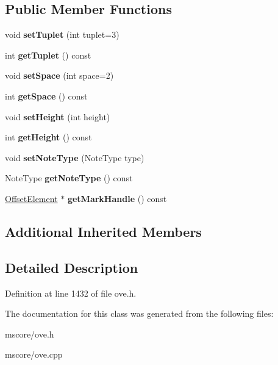 \subsection*{Public Member Functions}
\begin{DoxyCompactItemize}
\item 
\mbox{\label{class_o_v_e_1_1_tuplet_a0a871e9d3666c80bb87b34a4bd3e5e19}} 
void {\bfseries set\+Tuplet} (int tuplet=3)
\item 
\mbox{\label{class_o_v_e_1_1_tuplet_a838cfee16da0363566c0bbf0e7708576}} 
int {\bfseries get\+Tuplet} () const
\item 
\mbox{\label{class_o_v_e_1_1_tuplet_a61881d9943de95645859165c1b688b90}} 
void {\bfseries set\+Space} (int space=2)
\item 
\mbox{\label{class_o_v_e_1_1_tuplet_a9fd7ed16acbab11a164ba84dbc19b92f}} 
int {\bfseries get\+Space} () const
\item 
\mbox{\label{class_o_v_e_1_1_tuplet_a603f43330c648c3e2f2c045fbc0326b7}} 
void {\bfseries set\+Height} (int height)
\item 
\mbox{\label{class_o_v_e_1_1_tuplet_a4018f1a7977c174208a445ae7016134d}} 
int {\bfseries get\+Height} () const
\item 
\mbox{\label{class_o_v_e_1_1_tuplet_a3742508b5cff3284aa8d232e3b121126}} 
void {\bfseries set\+Note\+Type} (Note\+Type type)
\item 
\mbox{\label{class_o_v_e_1_1_tuplet_a767b5850fd8fb0acffeec0ab397bde4c}} 
Note\+Type {\bfseries get\+Note\+Type} () const
\item 
\mbox{\label{class_o_v_e_1_1_tuplet_a7c47b34e56cebd6007ff196a8c451766}} 
\hyperlink{class_o_v_e_1_1_offset_element}{Offset\+Element} $\ast$ {\bfseries get\+Mark\+Handle} () const
\end{DoxyCompactItemize}
\subsection*{Additional Inherited Members}


\subsection{Detailed Description}


Definition at line 1432 of file ove.\+h.



The documentation for this class was generated from the following files\+:\begin{DoxyCompactItemize}
\item 
mscore/ove.\+h\item 
mscore/ove.\+cpp\end{DoxyCompactItemize}
